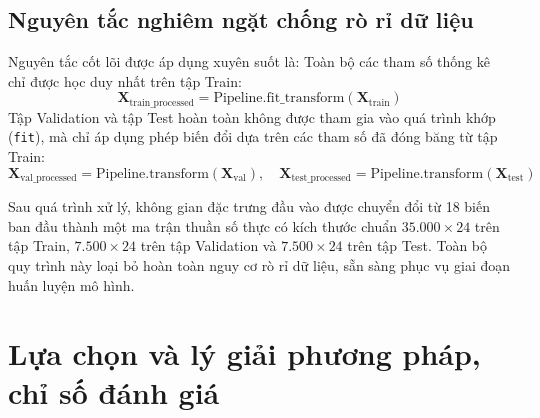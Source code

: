 \documentclass[12pt,a4paper,oneside]{report}
\begin{document}
\subsection{Nguyên tắc nghiêm ngặt chống rò rỉ dữ liệu}
Nguyên tắc cốt lõi được áp dụng xuyên suốt là: Toàn bộ các tham số thống kê chỉ được học duy nhất trên tập Train:
\begin{equation}
    \mathbf{X}_{\text{train\_processed}} = \text{Pipeline}.\text{fit\_transform}(\mathbf{X}_{\text{train}})
\end{equation}
Tập Validation và tập Test hoàn toàn không được tham gia vào quá trình khớp (\texttt{fit}), mà chỉ áp dụng phép biến đổi dựa trên các tham số đã đóng băng từ tập Train:
\begin{equation}
    \mathbf{X}_{\text{val\_processed}} = \text{Pipeline}.\text{transform}(\mathbf{X}_{\text{val}}), \quad \mathbf{X}_{\text{test\_processed}} = \text{Pipeline}.\text{transform}(\mathbf{X}_{\text{test}})
\end{equation}

Sau quá trình xử lý, không gian đặc trưng đầu vào được chuyển đổi từ 18 biến ban đầu thành một ma trận thuần số thực có kích thước chuẩn $35.000 \times 24$ trên tập Train, $7.500 \times 24$ trên tập Validation và $7.500 \times 24$ trên tập Test. Toàn bộ quy trình này loại bỏ hoàn toàn nguy cơ rò rỉ dữ liệu, sẵn sàng phục vụ giai đoạn huấn luyện mô hình.

\section{Lựa chọn và lý giải phương pháp, chỉ số đánh giá}
\end{document}
